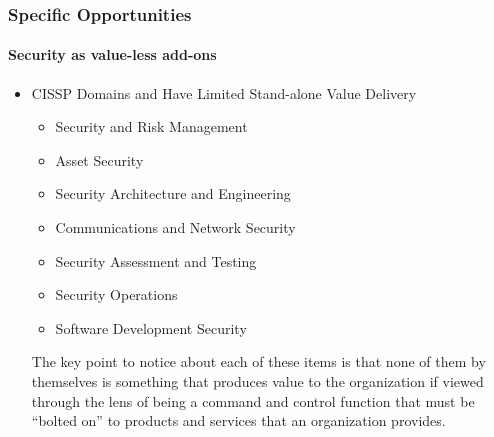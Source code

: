 \begin{frame}
  \frametitle{Specific Opportunities}
  \framesubtitle{Security as value-less add-ons}
  \begin{itemize}
    \item CISSP Domains and Have Limited Stand-alone Value Delivery
          \begin{itemize}
            \item Security and Risk Management
            \item Asset Security
            \item Security Architecture and Engineering
            \item Communications and Network Security
            \item Security Assessment and Testing
            \item Security Operations
            \item Software Development Security
          \end{itemize}

           {\scriptsize{The key point to notice about each of these items is that none of them by themselves is something that produces value to the organization if viewed through the lens of being a command and control function that must be ``bolted on'' to products and services that an organization provides. }}


  \end{itemize}
\end{frame}
